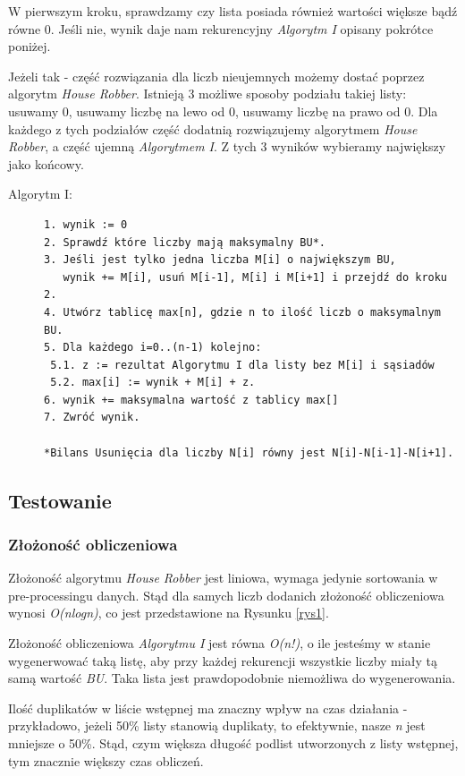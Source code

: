 \documentclass[11pt]{article} %
\begin{document}
W pierwszym kroku, sprawdzamy czy lista posiada również wartości większe bądź równe 0. Jeśli nie, wynik daje nam rekurencyjny \textsl{Algorytm I} opisany pokrótce poniżej. 

Jeżeli tak - część rozwiązania dla liczb nieujemnych możemy dostać poprzez algorytm \textsl{House Robber}. Istnieją 3 możliwe sposoby podziału takiej listy: usuwamy 0, usuwamy liczbę na lewo od 0, usuwamy liczbę na prawo od 0.
Dla każdego z tych podziałów część dodatnią rozwiązujemy algorytmem \textsl{House Robber}, a część ujemną \textsl{Algorytmem I}. Z tych 3 wyników wybieramy największy jako końcowy.\\

\begin{description}
\item[Algorytm I:]\leavevmode
\begin{lstlisting}
1. wynik := 0
2. Sprawdź które liczby mają maksymalny BU*.
3. Jeśli jest tylko jedna liczba M[i] o największym BU, 
   wynik += M[i], usuń M[i-1], M[i] i M[i+1] i przejdź do kroku 2.
4. Utwórz tablicę max[n], gdzie n to ilość liczb o maksymalnym BU.
5. Dla każdego i=0..(n-1) kolejno: 
 5.1. z := rezultat Algorytmu I dla listy bez M[i] i sąsiadów
 5.2. max[i] := wynik + M[i] + z.
6. wynik += maksymalna wartość z tablicy max[]
7. Zwróć wynik.

*Bilans Usunięcia dla liczby N[i] równy jest N[i]-N[i-1]-N[i+1].
\end{lstlisting}
\end{description}

\subsection{Testowanie}
\subsubsection{Złożoność obliczeniowa}
Złożoność algorytmu \textsl{House Robber} jest liniowa, wymaga jedynie sortowania w pre-processingu danych. Stąd dla samych liczb dodanich złożoność obliczeniowa wynosi \textsl{O(nlogn)}, co jest przedstawione na Rysunku \ref{rys1}.

Złożoność obliczeniowa \textsl{Algorytmu I} jest równa \textsl{O(n!)}, o ile jesteśmy w stanie wygenerwować taką listę, aby przy każdej rekurencji wszystkie liczby miały tą samą wartość \textsl{BU}. Taka lista jest prawdopodobnie niemożliwa do wygenerowania.

Ilość duplikatów w liście wstępnej ma znaczny wpływ na czas działania - przykładowo, jeżeli 50\% listy stanowią duplikaty, to efektywnie, nasze \textsl{n} jest mniejsze o 50\%.
Stąd, czym większa długość podlist utworzonych z listy wstępnej, tym znacznie większy czas obliczeń.
\end{document}

